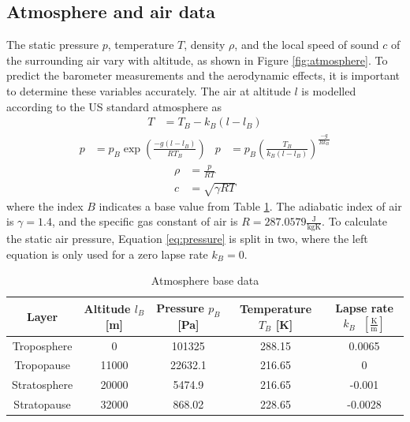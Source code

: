 \subsection{Atmosphere and air data}
\label{sec:model-atmosphere}
The static pressure $p$, temperature $T$, density $\rho$, and the local speed of sound $c$ of the surrounding air vary with altitude, as shown in Figure \ref{fig:atmosphere}.
To predict the barometer measurements and the aerodynamic effects, it is important to determine these variables accurately.
The air at altitude $l$ is modelled according to the US standard atmosphere \cite{stengel2004} as
\begin{align}
    T &= T_B - k_B (l-l_B) \label{eq:model-atmos1}
\end{align}
\begin{align}
    p &= p_B \exp \left( \frac{-g (l-l_B)}{R T_B} \right) &
    p &= p_B \left( \frac{T_B}{k_B (l-l_B)} \right) ^\frac{-g}{R k_B} \label{eq:pressure}
\end{align}
\begin{align}
    \rho &= \frac{p}{R T} \\
    c &= \sqrt{\gamma R T} \label{eq:model-atmos5}
\end{align}
where the index $B$ indicates a base value from Table \ref{tab:atmosphere}. 
The adiabatic index of air is $\gamma = 1.4$, and the specific gas constant of air is $R = 287.0579 \frac{\mathrm{J}}{\mathrm{kg K}}$.
To calculate the static air pressure, Equation \ref{eq:pressure} is split in two, where the left equation is only used for a zero lapse rate $k_B = 0$.
\begin{table}[ht]
\begin{center}
\begin{tabular}{c c c c c}
Layer & Altitude $l_B$ [m] & Pressure $p_B$ [Pa] & Temperature $T_B$ [K] & Lapse rate $k_B \text{ } [\frac{\mathrm{K}}{\mathrm{m}}]$  \\
\hline %
Troposphere & 0 & 101325 & 288.15 & 0.0065 \\
Tropopause & 11000 & 22632.1 & 216.65 & 0 \\
Stratosphere & 20000 & 5474.9 & 216.65 & -0.001 \\ 
Stratopause & 32000 & 868.02 & 228.65 & -0.0028 \\
\end{tabular}
\end{center}
\caption{Atmosphere base data} \label{tab:atmosphere}
\end{table}

